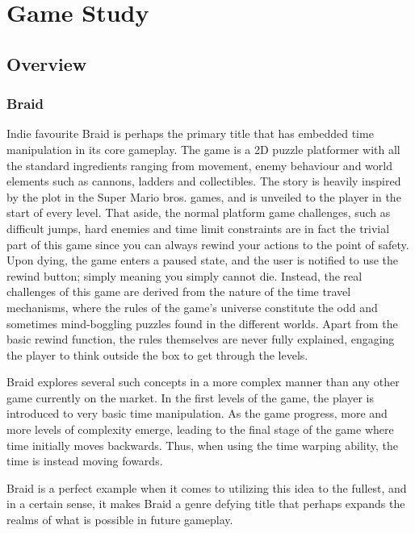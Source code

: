 
\chapter{Game Study}

\section{Overview}


\subsection{Braid}
Indie favourite Braid is perhaps the primary title that has embedded time manipulation in its core gameplay. The game is a 2D puzzle platformer with all the standard ingredients ranging from movement, enemy behaviour and world elements such as cannons, ladders and collectibles. The story is heavily inspired by the plot in the Super Mario bros. games, and is unveiled to the player in the start of every level. That aside, the normal platform game challenges, such as difficult jumps, hard enemies and time limit constraints are in fact the trivial part of this game since you can always rewind your actions to the point of safety. Upon dying, the game enters a paused state, and the user is notified to use the rewind button; simply meaning you simply cannot die. Instead, the real challenges of this game are derived from the nature of the time travel mechanisms, where the rules of the game's universe constitute the odd and sometimes mind-boggling puzzles found in the different worlds. Apart from the basic rewind function, the rules themselves are never fully explained, engaging the player to think outside the box to get through the levels. 

Braid explores several such concepts in a more complex manner than any other game currently on the market. In the first levels of the game, the player is introduced to very basic time manipulation. As the game progress, more and more levels of complexity emerge, leading to the final stage of the game where time initially moves backwards. Thus, when using the time warping ability, the time is instead moving fowards.

Braid is a perfect example when it comes to utilizing this idea to the fullest, and in a certain sense, it makes Braid a genre defying title that perhaps expands the realms of what is possible in future gameplay. 

